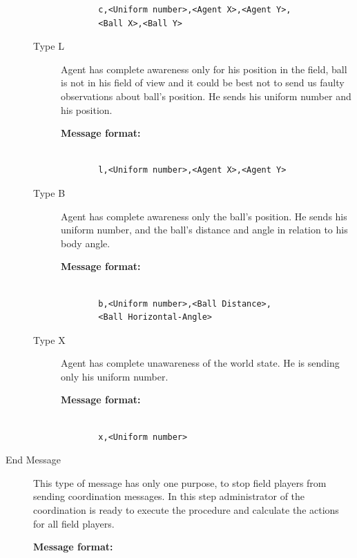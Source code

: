 \begin{description}
\begin{description}
\begin{description}
\begin{verbatim}
  c,<Uniform number>,<Agent X>,<Agent Y>,
  <Ball X>,<Ball Y>
  \end{verbatim}
\end{description}

\item[Type L] Agent has complete awareness only for his position in the field, ball is not in his field of view and it could be best not to send us faulty observations about ball's position. He sends his uniform number and his position.

\begin{description}
  \item[{\bf Message format:}]
  \begin{verbatim}
  
  l,<Uniform number>,<Agent X>,<Agent Y>
  \end{verbatim}
\end{description}

\item[Type B] Agent has complete awareness only the ball's position. He sends his uniform number,  and the ball's distance and angle in relation to his body angle.

\begin{description}
  \item[{\bf Message format:}]
  \begin{verbatim}
  
  b,<Uniform number>,<Ball Distance>,
  <Ball Horizontal-Angle>
  \end{verbatim}
\end{description}

\item[Type X] Agent has complete unawareness of the world state. He is sending only his uniform number.

\begin{description}
  \item[{\bf Message format:}]
  \begin{verbatim}
  
  x,<Uniform number>
  \end{verbatim}
\end{description}

\end{description}
\item[End Message]
This type of message has only one purpose, to stop field players from sending coordination messages. In this step administrator of the coordination is ready to execute the procedure and calculate the actions for all field players.
\begin{description}
  \item[{\bf Message format:}]
  \begin{verbatim}
  

\end{verbatim}
\end{description}
\end{description}
